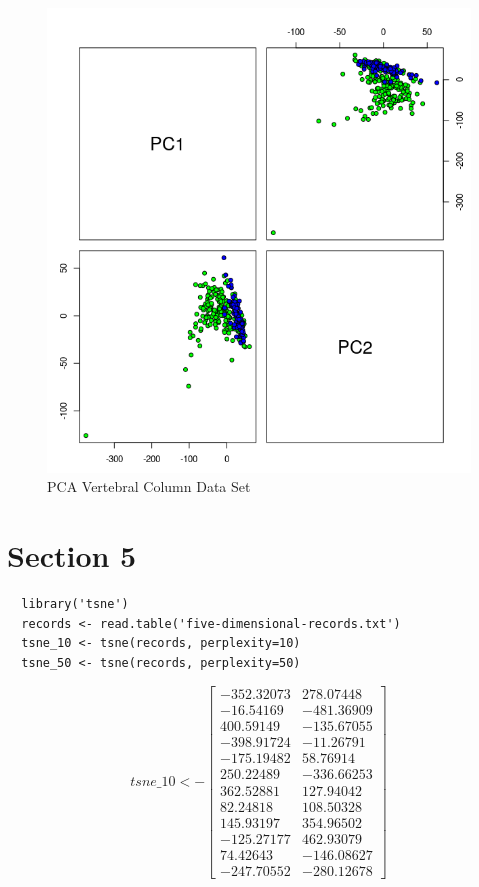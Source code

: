 \documentclass{report}
\begin{document}
\begin{figure}[H]
  \includegraphics[width=\linewidth]{pca_vertebral_column_data_set.png}
  \caption{PCA Vertebral Column Data Set}
  \label{fig:PCAVertebralColumnDataSetScatterPlot}
\end{figure}

\chapter{Section 5}

\begin{verbatim}	
  library('tsne')
  records <- read.table('five-dimensional-records.txt') 
  tsne_10 <- tsne(records, perplexity=10)
  tsne_50 <- tsne(records, perplexity=50)
\end{verbatim}

\[
  tsne\_10 <- 
  \begin{bmatrix}
    -352.32073 & 278.07448 \\
    -16.54169 & -481.36909 \\
    400.59149 & -135.67055 \\
    -398.91724 & -11.26791 \\
    -175.19482 & 58.76914 \\
    250.22489 & -336.66253 \\
    362.52881 & 127.94042 \\
    82.24818 & 108.50328 \\
    145.93197 & 354.96502 \\
    -125.27177 & 462.93079 \\
    74.42643 & -146.08627 \\
    -247.70552 & -280.12678
  \end{bmatrix}
\]
\end{document}
